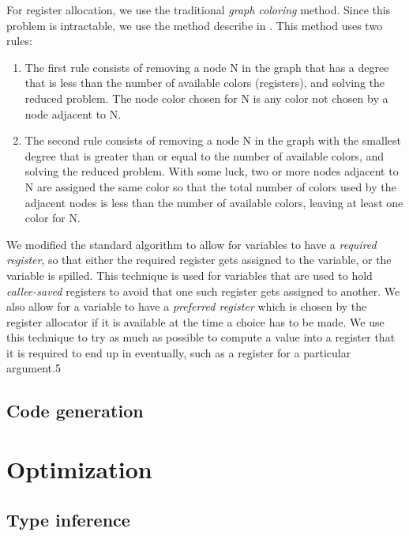 For register allocation, we use the traditional \emph{graph coloring}
method.  Since this problem is intractable, we use the method describe
in \cite{Muchnick:1998:ACD:286076}.  This method uses two rules:

\begin{enumerate}
\item The first rule consists of removing a node N in the graph that
  has a degree that is less than the number of available colors
  (registers), and solving the reduced problem.  The node color chosen
  for N is any color not chosen by a node adjacent to N.
\item The second rule consists of removing a node N in the graph with
  the smallest degree that is greater than or equal to the number of
  available colors, and solving the reduced problem.  With some luck,
  two or more nodes adjacent to N are assigned the same color so that
  the total number of colors used by the adjacent nodes is less than
  the number of available colors, leaving at least one color for N.
\end{enumerate}

We modified the standard algorithm to allow for variables to have a
\emph{required register}, so that either the required register gets
assigned to the variable, or the variable is spilled.  This technique
is used for variables that are used to hold \emph{callee-saved}
registers to avoid that one such register gets assigned to another.
We also allow for a variable to have a \emph{preferred register} which
is chosen by the register allocator if it is available at the time a
choice has to be made.  We use this technique to try as much as
possible to compute a value into a register that it is required to end
up in eventually, such as a register for a particular argument.5

\subsection{Code generation} 

\section{Optimization}

\subsection{Type inference}

